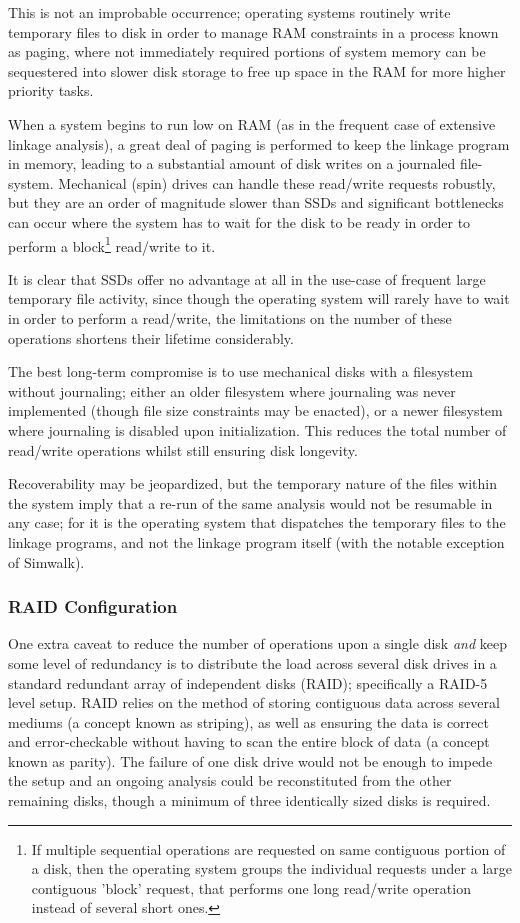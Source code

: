 This is not an improbable occurrence; operating systems routinely write temporary files to disk in order to manage RAM constraints in a process known as \gls{paging}, where not immediately required portions of system memory can be sequestered into slower disk storage to free up space in the RAM for more higher priority tasks. 

When a system begins to run low on \gls{RAM} (as in the frequent case of extensive linkage analysis), a great deal of paging is performed to keep the linkage program in memory, leading to a substantial amount of disk writes on a journaled file-system. Mechanical (spin) drives can handle these read/write requests robustly, but they are an order of magnitude slower than SSDs and significant bottlenecks can occur where the system has to wait for the disk to be ready in order to perform a block\footnote{If multiple sequential operations are requested on same contiguous portion of a disk, then the operating system groups the individual requests under a large contiguous 'block' request, that performs one long read/write operation instead of several short ones.}    read/write to it.

It is clear that SSDs offer no advantage at all in the use-case of frequent large temporary file activity, since though the operating system will rarely have to wait in order to perform a read/write, the limitations on the number of these operations shortens their lifetime considerably.

The best long-term compromise is to use mechanical disks with a filesystem without journaling; either an older filesystem where journaling was never implemented (though file size constraints may be enacted), or a newer filesystem where journaling is disabled upon initialization. This reduces the total number of read/write operations whilst still ensuring disk longevity.

Recoverability may be jeopardized, but the temporary nature of the files within the system imply that a re-run of the same analysis would not be resumable in any case; for it is the operating system that dispatches the temporary files to the linkage programs, and not the linkage program itself (with the  notable exception of \gls{Simwalk}).


\subsubsection{RAID Configuration}

One extra caveat to reduce the number of operations upon a single disk \textit{and} keep some level of redundancy is to distribute the load across several disk drives in a standard redundant array of independent disks (\gls{RAID}); specifically a RAID-5 level setup. RAID relies on the method of storing contiguous data across several mediums (a concept known as \gls{striping}), as well as ensuring the data is correct and error-checkable without having to scan the entire block of data (a concept known as \gls{parity}). The failure of one disk drive would not be enough to impede the setup and an ongoing analysis could be reconstituted from the other remaining disks, though a minimum of three identically sized disks is required.

